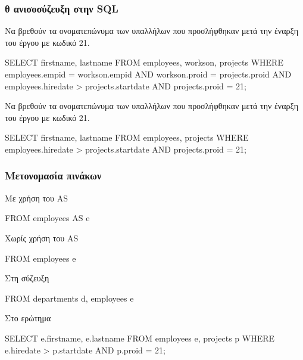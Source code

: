 \begin{frame}
\frametitle{θ ανισοσύζευξη στην {\en SQL}}
\begin{minipage}{\wE}
\vspace*{-0.5cm}
\begin{alertblock}{\small Να βρεθούν τα ονοματεπώνυμα των υπαλλήλων που προσλήφθηκαν μετά την έναρξη του έργου με κωδικό 21.}
\en
\begin{SQL}
  SELECT firstname, lastname
    FROM employees, workson, projects
   WHERE employees.empid = workson.empid
     AND workson.proid = projects.proid
     AND employees.hiredate > projects.startdate
     AND projects.proid = 21;
\end{SQL}
\el
\end{alertblock}
\pause
\vspace*{-0.4cm}
\begin{exampleblock}{\small Να βρεθούν τα ονοματεπώνυμα των υπαλλήλων που προσλήφθηκαν μετά την έναρξη του έργου με κωδικό 21.}
\en
\begin{SQL}
  SELECT firstname, lastname
    FROM employees, projects
   WHERE employees.hiredate > projects.startdate
     AND projects.proid = 21;
\end{SQL}
\el
\end{exampleblock}
\end{minipage}
\end{frame}



\begin{frame}
\frametitle{Μετονομασία πινάκων}
\begin{minipage}{\wE}
\vspace*{-0.5cm}
\begin{block}{Με χρήση του {\en AS}}
\en
\begin{SQL}
    FROM employees AS e
\end{SQL}
\el
\end{block}
\vspace*{-0.4cm}
\begin{block}{Χωρίς χρήση του {\en AS}}
\en
\begin{SQL}
    FROM employees e
\end{SQL}
\el
\end{block}
\pause
\vspace*{-0.4cm}
\begin{block}{Στη σύζευξη}
\en
\begin{SQL}
    FROM departments d, employees e
\end{SQL}
\el
\end{block}
\pause
\vspace*{-0.4cm}
\begin{block}{Στο ερώτημα}
\en
\begin{SQL}
  SELECT e.firstname, e.lastname
    FROM employees e, projects p
   WHERE e.hiredate > p.startdate
     AND p.proid = 21;   
\end{SQL}
\el
\end{block}
\end{minipage}
\end{frame}
